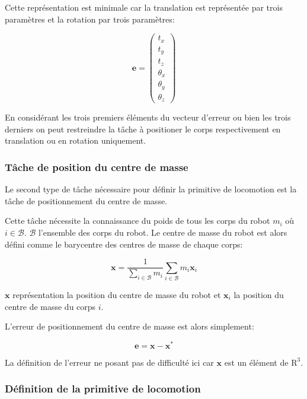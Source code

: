 Cette représentation est minimale car la translation est représentée
par trois paramètres et la rotation par trois paramètres:

\begin{equation}
  \mathbf{e} = \left(
  \begin{array}{c}
    t_x\\
    t_y\\
    t_z\\
    \theta_x\\
    \theta_y\\
    \theta_z
  \end{array}
  \right)
\end{equation}

En considérant les trois premiers éléments du vecteur d'erreur ou bien
les trois derniers on peut restreindre la tâche à positioner le corps
respectivement en translation ou en rotation uniquement.


\subsubsection{Tâche de position du centre de masse}


Le second type de tâche nécessaire pour définir la primitive de
locomotion est la tâche de positionnement du centre de masse.

Cette tâche nécessite la connaissance du poids de tous les corps du
robot $m_i$ où $i \in \mathcal{B}$. $\mathcal{B}$ l'ensemble des corps
du robot. Le centre de masse du robot est alors défini comme le
barycentre des centres de masse de chaque corps:

\begin{equation}
  \mathbf{x} = \frac{1}{\sum_{i \in \mathcal{B}} m_i} \sum_{i \in \mathcal{B}} m_i \mathbf{x}_i
\end{equation}

$\mathbf{x}$ représentation la position du centre de masse du robot et
$\mathbf{x}_i$ la position du centre de masse du corps $i$.

L'erreur de positionnement du centre de masse est alors simplement:

\begin{equation}
  \mathbf{e} = \mathbf{x} - \mathbf{x}^{*}
\end{equation}

La définition de l'erreur ne posant pas de difficulté ici car
$\mathbf{x}$ est un élément de $\mathrm{R}^3$.


\subsubsection{Définition de la primitive de locomotion}

